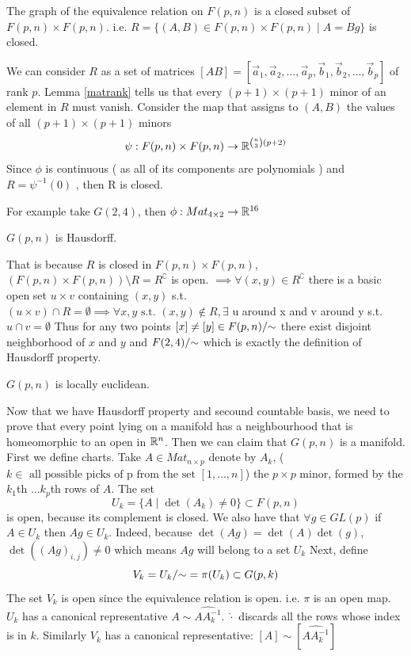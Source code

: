\documentclass[11pt,a4paper]{report}
\begin{document}
\begin{Prop}
The graph of the equivalence relation on $F(p,n)$ is a closed subset of $F(p,n) \times F(p,n)$. i.e. $ R = \{ (A,B) \in F(p,n) \times F(p,n) \; | \; A = Bg \}$ is closed.
\end{Prop}
We can consider $R$ as a set of matrices $[A B] = [\vec{a}_1, \vec{a}_2, \dots, \vec{a}_p, \vec{b}_1, \vec{b}_2, \dots , \vec{b}_p]$ of rank $p$.
Lemma \ref{matrank} tells us that every $(p+1) \times (p+1) $ minor of an element in $R$ must vanish. Consider the map that assigns to $(A,B)$ the values of all $ (p+1) \times (p+1) $ minors
$$ \psi:  F(p,n) \times F(p,n) \to \mathbb{R}^{ {n \choose 3} (p+2) }$$
Since $\phi$ is continuous ( as all of its components are polynomials )  and $R = \psi^{-1} (0) $ , then R is closed.
\begin{Ex}
    For example take $G(2,4)$, then $\phi: Mat_{4 \times 2} \to \mathbb{R}^{16}$ 
\end{Ex}
\begin{Prop}\label{HausP}
$G(p,n)$ is Hausdorff.
\end{Prop}

That is because $R$ is closed in $F(p,n) \times F(p,n)$, $(F(p,n) \times F(p,n)) \setminus R = R^{\complement}$ is open.
$\implies \forall (x,y) \in R^{\complement} $ there is a basic open set $u \times v$ containing $(x,y)$ s.t. $ (u \times v) \cap R = \emptyset 
\implies \forall x, y \text{ s.t. } (x,y) \not\in R, \exists$ u around x and v around y s.t. $u \cap v = \emptyset$
Thus for any two points $[x] \neq [y] \in F(p,n)/{\sim}$ there exist disjoint neighborhood of $x$ and $y$ and $ F(2,4)/{\sim}$ which is exactly the definition of Hausdorff property.
\newline
\begin{Prop}\label{locEc}
   $G(p,n)$ is locally euclidean. 
\end{Prop}
Now that we have Hausdorff property and secound countable basis, we need to prove that every point lying on a manifold has a neighbourhood that is homeomorphic to an open in $\mathbb{R}^n$.
Then we can claim that $G(p,n)$ is a manifold.
\newline
First we define charts. Take $A \in Mat_{n \times p} $ denote by $A_{k}$, ($ k \in \text{ all possible picks of p from the set } [1, \dots , n] $) the $p \times p$ minor, formed by the $k_1$th $\dots k_p$th rows of $A$.
The set
$$ U_{k} = \{ A \; | \; \det(A_{k}) \neq 0 \} \subset F(p,n)$$ is open, because its complement is closed. 
We also have that $\forall g \in GL(p)$ if $A \in U_{k}$ then $ Ag \in U_{k}$. 
Indeed, because $\det(Ag) = \det(A) \det(g)$, $\det( (Ag)_{i,j}) \neq 0$ which means $Ag$  will belong to a set $U_{k}$ 
Next, define
$$V_{k} = U_{k}/{\sim} = \pi (U_{k}) \subset G(p,k)$$
The set $V_{k}$ is open since the equivalence relation is open. i.e. $\pi$ is an open map.
\newline
$U_k$ has a canonical representative $A \sim \widehat{A A_{k}^{-1}}$. $\widehat{\cdot}$ discards all the rows whose index is in $k$.
Similarly $V_k$ has a canonical representative: $[A] \sim [\widehat{A A_{k}^{-1}}] $
\end{document}
